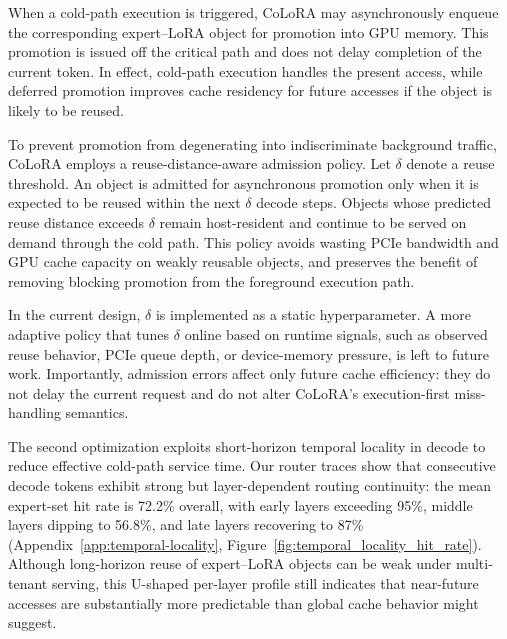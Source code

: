 \documentclass[sigplan,anonymous,review,nonacm]{acmart}
\begin{document}
When a cold-path execution is triggered, CoLoRA may asynchronously enqueue the corresponding expert--LoRA object for promotion into GPU memory. This promotion is issued off the critical path and does not delay completion of the current token. In effect, cold-path execution handles the present access, while deferred promotion improves cache residency for future accesses if the object is likely to be reused.

To prevent promotion from degenerating into indiscriminate background traffic, CoLoRA employs a reuse-distance-aware admission policy. Let $\delta$ denote a reuse threshold. An object is admitted for asynchronous promotion only when it is expected to be reused within the next $\delta$ decode steps. Objects whose predicted reuse distance exceeds $\delta$ remain host-resident and continue to be served on demand through the cold path. This policy avoids wasting PCIe bandwidth and GPU cache capacity on weakly reusable objects, and preserves the benefit of removing blocking promotion from the foreground execution path.

In the current design, $\delta$ is implemented as a static hyperparameter. A more adaptive policy that tunes $\delta$ online based on runtime signals, such as observed reuse behavior, PCIe queue depth, or device-memory pressure, is left to future work. Importantly, admission errors affect only future cache efficiency: they do not delay the current request and do not alter CoLoRA's execution-first miss-handling semantics.

The second optimization exploits short-horizon temporal locality in decode to reduce effective cold-path service time. Our router traces show that consecutive decode tokens exhibit strong but layer-dependent routing continuity: the mean expert-set hit rate is 72.2\% overall, with early layers exceeding 95\%, middle layers dipping to 56.8\%, and late layers recovering to 87\% (Appendix~\ref{app:temporal-locality}, Figure~\ref{fig:temporal_locality_hit_rate}). Although long-horizon reuse of expert--LoRA objects can be weak under multi-tenant serving, this U-shaped per-layer profile still indicates that near-future accesses are substantially more predictable than global cache behavior might suggest.
\end{document}

